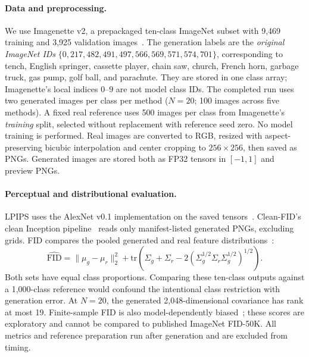 \documentclass[sigconf,nonacm]{acmart}
\begin{document}
\paragraph{Data and preprocessing.}
We use Imagenette v2, a prepackaged ten-class ImageNet subset with 9,469
training and 3,925 validation images~\cite{howard2019imagenette}. The generation
labels are the \emph{original ImageNet IDs}
$\{0,217,482,491,497,566,569,571,574,701\}$, corresponding to tench,
English springer, cassette player, chain saw, church, French horn, garbage
truck, gas pump, golf ball, and parachute. They are stored in one class array;
Imagenette's local indices $0$--$9$ are not model class IDs.
The completed run uses two generated images per class per method
($N=20$; 100 images across five methods). A fixed real reference uses 500
images per class from Imagenette's \emph{training} split, selected without
replacement with reference seed zero. No model training is performed.
Real images are converted to RGB, resized with aspect-preserving bicubic
interpolation and center cropping to $256\times256$, then saved as PNGs.
Generated images are stored both as FP32 tensors in $[-1,1]$ and preview PNGs.

\paragraph{Perceptual and distributional evaluation.}
LPIPS uses the AlexNet v0.1 implementation on the saved tensors~\cite{zhang2018lpips}.
Clean-FID's clean Inception pipeline~\cite{parmar2022cleanfid} reads only
manifest-listed generated PNGs, excluding grids. FID compares the pooled
generated and real feature distributions~\cite{heusel2017fid}:
\begin{equation}
 \widehat{\mathrm{FID}}=
 \|\mu_g-\mu_r\|_2^2+
 \mathrm{tr}\!\left(\Sigma_g+\Sigma_r
 -2(\Sigma_g^{1/2}\Sigma_r\Sigma_g^{1/2})^{1/2}\right).
 \label{eq:fid}
\end{equation}
Both sets have equal class proportions. Comparing these ten-class outputs
against a 1,000-class reference would confound the intentional class
restriction with generation error. At $N=20$, the generated 2,048-dimensional
covariance has rank at most 19. Finite-sample FID is also model-dependently
biased~\cite{chong2020fid}; these scores are exploratory and cannot be compared
to published ImageNet FID-50K. All metrics and reference preparation run
after generation and are excluded from timing.
\end{document}
